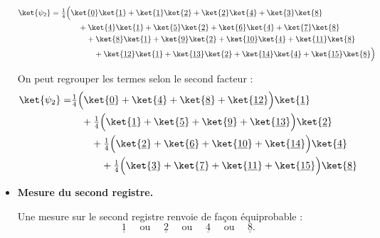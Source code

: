 \documentclass[11pt,class=report,crop=false]{standalone}
\begin{document}
\begin{itemize}
\begin{align*}
\ket{\psi_2} = 
\tfrac{1}{4} \Big(
&         \ket{\underline{0}}\ket{\underline1} + \ket{\underline{1}}\ket{\underline2} + \ket{\underline{2}}\ket{\underline4} + \ket{\underline{3}}\ket{\underline8} \\
&\quad + \ket{\underline{4}}\ket{\underline1} + \ket{\underline{5}}\ket{\underline2} + \ket{\underline{6}}\ket{\underline4} + \ket{\underline{7}}\ket{\underline8} \\
&\quad\quad + \ket{\underline{8}}\ket{\underline1} + \ket{\underline{9}}\ket{\underline2} + \ket{\underline{10}}\ket{\underline4} + \ket{\underline{11}}\ket{\underline8} \\
&\quad\quad\quad + \ket{\underline{12}}\ket{\underline1} + \ket{\underline{13}}\ket{\underline2} + \ket{\underline{14}}\ket{\underline4} + \ket{\underline{15}}\ket{\underline8} \Big)
\end{align*}

On peut regrouper les termes selon le second facteur :
\begin{align*}
\ket{\psi_2} = 
& \tfrac{1}{4} \Big( \ket{\underline{0}} + \ket{\underline{4}} + \ket{\underline{8}} + \ket{\underline{12}} \Big)  \ket{\underline1} \\
&\quad +\tfrac{1}{4} \Big( \ket{\underline{1}} + \ket{\underline{5}} + \ket{\underline{9}} + \ket{\underline{13}} \Big)  \ket{\underline2} \\
&\quad\quad +\tfrac{1}{4} \Big( \ket{\underline{2}} + \ket{\underline{6}} + \ket{\underline{10}} + \ket{\underline{14}} \Big)  \ket{\underline4} \\
&\quad\quad\quad +\tfrac{1}{4} \Big( \ket{\underline{3}} + \ket{\underline{7}} + \ket{\underline{11}} + \ket{\underline{15}} \Big)  \ket{\underline8} \\
\end{align*}

 
  \item \textbf{Mesure du second registre.}

  Une mesure sur le second registre renvoie de façon équiprobable :
  $$\underline1 \quad \text{ ou } \quad \underline2 \quad \text{ ou } \quad \underline4 \quad \text{ ou } \quad \underline8.$$


\end{itemize}
\end{document}
